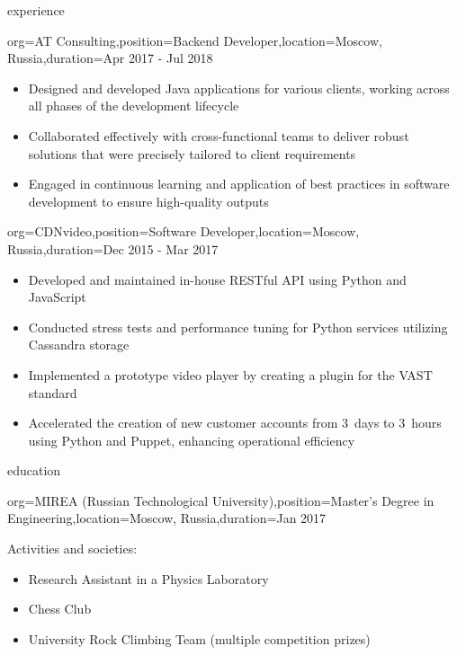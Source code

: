 \documentclass{resume}
\begin{document}
\begin{ResumeSection}{experience}
    \begin{ResumeSubsection}{org={AT Consulting},position={Backend Developer},location={Moscow, Russia},duration=Apr 2017 - Jul 2018}
    \begin{itemize}
	\item Designed and developed Java applications for various clients, working across all phases of the development lifecycle
        \item Collaborated effectively with cross-functional teams to deliver robust solutions that were precisely tailored to client requirements
        \item Engaged in continuous learning and application of best practices in software development to ensure high-quality outputs
    \end{itemize}
    \end{ResumeSubsection}

    \begin{ResumeSubsection}{org=CDNvideo,position=Software Developer,location={Moscow, Russia},duration=Dec 2015 - Mar 2017}
        \begin{itemize}
            \item Developed and maintained in-house RESTful API using Python and JavaScript
            \item Conducted stress tests and performance tuning for Python services utilizing Cassandra storage
            \item Implemented a prototype video player by creating a plugin for the VAST standard
            \item Accelerated the creation of new customer accounts from 3~days to 3~hours using Python and Puppet, enhancing operational efficiency
        \end{itemize}
    \end{ResumeSubsection}
\end{ResumeSection}

\begin{ResumeSection}{education}
    \begin{ResumeSubsection}{org={MIREA (Russian Technological University)},position={Master's Degree in Engineering},location={Moscow, Russia},duration=Jan 2017}
        
        \medskip
        Activities and societies:
        \begin{itemize}
            \item Research Assistant in a Physics Laboratory
            \item Chess Club
            \item University Rock Climbing Team (multiple competition prizes)
        \end{itemize}
    \end{ResumeSubsection}
\end{ResumeSection}
\end{document}

